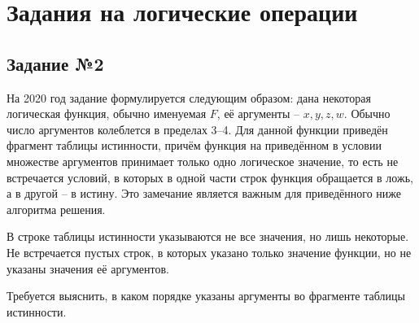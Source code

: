 \section{Задания на логические операции}
\subsection{Задание №2}
На 2020 год задание формулируется следующим образом: дана некоторая логическая функция, обычно именуемая $F$, её аргументы -- $x, y, z, w$. Обычно число аргументов колеблется в пределах 3--4. Для данной функции приведён фрагмент таблицы истинности, причём функция на приведённом в условии множестве аргументов принимает только одно логическое значение, то есть не встречается условий, в которых в одной части строк функция обращается в ложь, а в другой -- в истину. Это замечание является важным для приведённого ниже алгоритма решения. 

В строке таблицы истинности указываются не все значения, но лишь некоторые. Не встречается пустых строк, в которых указано только значение функции, но не указаны значения её аргументов.


Требуется выяснить, в каком порядке указаны аргументы во фрагменте таблицы истинности.

